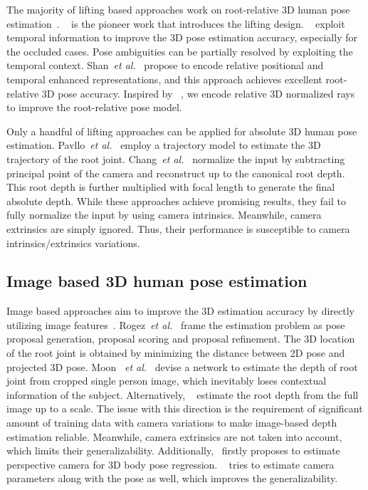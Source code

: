 \documentclass[10pt,twocolumn,letterpaper]{article}
\def\etal{\emph{et al.}}
\begin{document}
The majority of lifting based approaches work on root-relative 3D human pose estimation~\cite{martinez2017simple,ce2021poseformer,TomeRA17,wenkang2021improving,yujun2019exploiting,ChengYWWT19,DabralMKASJ18,dario2019videopose,ZhangHW2020,ZhouH0XW17,LiuSW0CA20}. ~\cite{martinez2017simple} is the pioneer work that introduces the lifting design. ~\cite{yujun2019exploiting,ce2021poseformer,dario2019videopose, wenkang2021improving} exploit temporal information to improve the 3D pose estimation accuracy, especially for the occluded cases. Pose ambiguities can be partially resolved by exploiting the temporal context. Shan~\etal ~\cite{wenkang2021improving} propose to encode relative positional and temporal enhanced representations, and this approach achieves excellent root-relative 3D pose accuracy. Inspired by ~\cite{wenkang2021improving}, we encode relative 3D normalized rays to improve the root-relative pose model.


Only a handful of lifting approaches can be applied for absolute 3D human pose estimation. Pavllo~\etal~\cite{dario2019videopose} employ a trajectory model to estimate the 3D trajectory of the root joint. Chang~\etal ~\cite{ju2019absposelifter} normalize the input by subtracting principal point of the camera and reconstruct up to the canonical root depth. This root depth is further multiplied with focal length to generate the final absolute depth. While these approaches achieve promising results, they fail to fully normalize the input by using camera intrinsics. Meanwhile, camera extrinsics are simply ignored. Thus, their performance is susceptible to camera intrinsics/extrinsics variations.  

\noindent\subsection{Image based 3D human pose estimation} 
Image based approaches aim to improve the 3D estimation accuracy by directly utilizing image features~\cite{ijcnn2019abs,wang2020hmor,jianan2020smap,icann2020multi,vibe,BCNet2020,zerong2019deephuman,nikos2019learning,zhang2021pymaf,learning2019thiemo,KolotourosPD19}. Rogez~\etal~\cite{lcr2017cvpr} frame the estimation problem as pose proposal generation, proposal scoring and proposal refinement. The 3D location of the root joint is obtained by minimizing the distance between 2D pose and projected 3D pose. Moon ~\etal~\cite{moon2019camera} devise a network to estimate the depth of root joint from cropped single person image, which inevitably loses contextual information of the subject. Alternatively, ~\cite{ijcnn2019abs,wang2020hmor,jianan2020smap,icann2020multi} estimate the root depth from the full image up to a scale. The issue with this direction is the requirement of significant amount of training data with camera variations to make image-based depth estimation reliable. Meanwhile, camera extrinsics are not taken into account, which limits their generalizability. Additionally,~\cite{Kocabas21} firstly proposes to estimate perspective camera for 3D body pose regression. ~\cite{Kocabas21} tries to estimate camera parameters along with the pose as well, which improves the generalizability.
\end{document}

